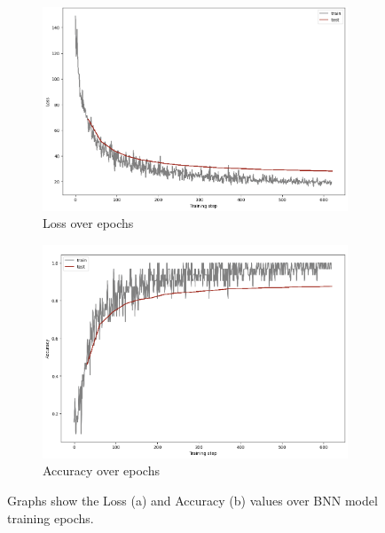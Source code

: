 \begin{figure}[h]
     \centering
     \begin{subfigure}[b]{0.9\textwidth}
         \centering
         \includegraphics[width=\textwidth]{observational/img/bnn/bnn_loss.png}
         \caption{Loss over epochs}
         \label{fig:bnn-learning:loglikelihood}
     \end{subfigure}
     \begin{subfigure}[b]{0.9\textwidth}
         \centering
         \includegraphics[width=\textwidth]{observational/img/bnn/bnn_acc.png}
         \caption{Accuracy over epochs}
         \label{fig:bpca-inference:elbo}
     \end{subfigure} 
     \caption[Loss and accuracy course during BNN learning]{Graphs show the Loss (a) and Accuracy (b) values over BNN model training epochs.}
    \label{fig:bnn-learning}
\end{figure}

